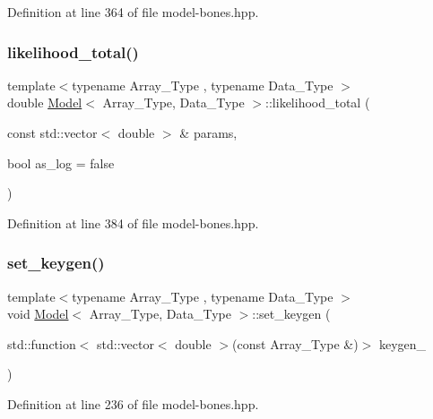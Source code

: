 Definition at line 364 of file model-\/bones.\+hpp.

\mbox{\label{class_model_a2fe9cf412c5b2323c35c18952f9cb09d}} 
\subsubsection{\texorpdfstring{likelihood\+\_\+total()}{likelihood\_total()}}
{\footnotesize\ttfamily template$<$typename Array\+\_\+\+Type , typename Data\+\_\+\+Type $>$ \\
double \hyperlink{class_model}{Model}$<$ Array\+\_\+\+Type, Data\+\_\+\+Type $>$\+::likelihood\+\_\+total (\begin{DoxyParamCaption}\item[{const std\+::vector$<$ double $>$ \&}]{params,  }\item[{bool}]{as\+\_\+log = {\ttfamily false} }\end{DoxyParamCaption})\hspace{0.3cm}{\ttfamily [inline]}}



Definition at line 384 of file model-\/bones.\+hpp.

\mbox{\label{class_model_afa4736153fa419e1f141839eda735dfe}} 
\subsubsection{\texorpdfstring{set\+\_\+keygen()}{set\_keygen()}}
{\footnotesize\ttfamily template$<$typename Array\+\_\+\+Type , typename Data\+\_\+\+Type $>$ \\
void \hyperlink{class_model}{Model}$<$ Array\+\_\+\+Type, Data\+\_\+\+Type $>$\+::set\+\_\+keygen (\begin{DoxyParamCaption}\item[{std\+::function$<$ std\+::vector$<$ double $>$(const Array\+\_\+\+Type \&)$>$}]{keygen\+\_\+ }\end{DoxyParamCaption})\hspace{0.3cm}{\ttfamily [inline]}}



Definition at line 236 of file model-\/bones.\+hpp.



